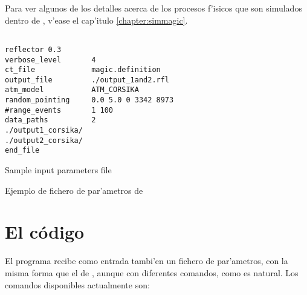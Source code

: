 Para ver algunos de los detalles acerca de los procesos f'isicos que
son simulados dentro de , v'ease el cap'itulo
\ref{chapter:simmagic}.

\begin{listado}
\begin{verbatim}

reflector 0.3
verbose_level       4 
ct_file             magic.definition 
output_file         ./output_1and2.rfl 
atm_model           ATM_CORSIKA 
random_pointing     0.0 5.0 0 3342 8973 
#range_events       1 100 
data_paths          2 
./output1_corsika/ 
./output2_corsika/ 
end_file 
\end{verbatim}
\ifenglish
\caption{Sample  input parameters file}
\else
\caption{Ejemplo de fichero de par'ametros de }
\fi
\label{fig:reflectorinput}
\end{listado}

\section{El c\'odigo \camera}
\label{sec:camera}
%
El programa \camera recibe como entrada tambi'en un fichero de
par'ametros, con la misma forma que el de , aunque con
diferentes comandos, como es natural. Los comandos disponibles
actualmente son:

